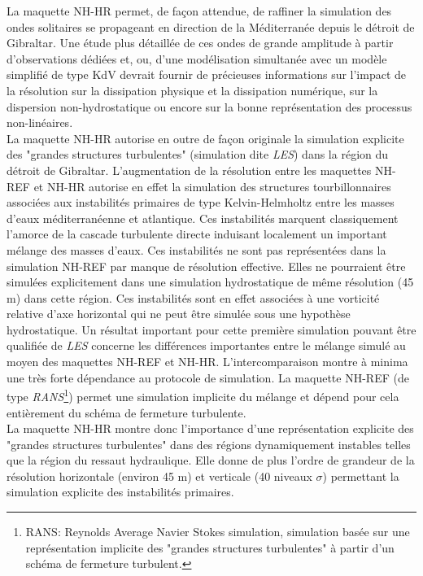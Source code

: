\documentclass[a4paper,11pt]{report}
\begin{document}
La maquette NH-HR permet, de façon attendue, de raffiner la simulation des ondes solitaires se propageant en direction de la Méditerranée depuis le détroit de Gibraltar. Une étude plus détaillée de ces ondes de grande amplitude à partir d'observations dédiées et, ou, d'une modélisation simultanée avec un modèle simplifié de type KdV devrait fournir de précieuses informations sur l'impact de la résolution sur la dissipation physique et la dissipation numérique, sur la dispersion non-hydrostatique ou encore sur la bonne représentation des processus non-linéaires.\\
La maquette  NH-HR autorise en outre de façon originale la simulation explicite des "grandes structures turbulentes" (simulation dite \textit{LES}) dans la région du détroit de Gibraltar. L'augmentation de la résolution entre les maquettes NH-REF et NH-HR autorise en effet la simulation des structures tourbillonnaires associées aux instabilités primaires de type Kelvin-Helmholtz entre les masses d'eaux méditerranéenne et atlantique. Ces instabilités marquent classiquement l'amorce de la cascade turbulente directe induisant localement un important mélange des masses d'eaux. Ces instabilités ne sont pas représentées dans la simulation NH-REF par manque de résolution effective. Elles ne pourraient être simulées explicitement dans une simulation hydrostatique de même résolution (45 m) dans cette région. Ces instabilités sont en effet associées à une vorticité relative d'axe horizontal qui ne peut être simulée sous une hypothèse hydrostatique. Un résultat important pour cette première simulation pouvant être qualifiée de \textit{LES} concerne les différences importantes entre le mélange simulé au moyen des maquettes NH-REF et NH-HR. L'intercomparaison montre à minima une très forte dépendance au protocole de simulation. La maquette NH-REF (de type \textit{RANS}\footnote{RANS: Reynolds Average Navier Stokes simulation, simulation basée sur une représentation implicite des "grandes structures turbulentes" à partir d'un schéma de fermeture turbulent.}) permet une simulation implicite du mélange et dépend pour cela entièrement du schéma de fermeture turbulente.\\
La maquette NH-HR montre donc l'importance d'une représentation explicite des "grandes structures turbulentes" dans des régions dynamiquement instables telles que la région du ressaut hydraulique. Elle donne de plus l'ordre de grandeur de la résolution horizontale (environ 45 m) et verticale (40 niveaux $\sigma$) permettant la simulation explicite des instabilités primaires.\\
\end{document}
